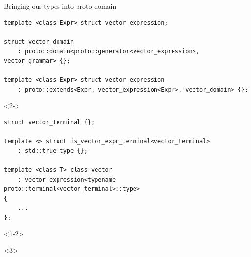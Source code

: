 \documentclass[@BEAMER_OPTIONS@]{beamer}
\begin{document}
\begin{frame}[fragile]{Bringing our types into proto domain}
    \begin{exampleblock}{}
        \begin{lstlisting}
template <class Expr> struct vector_expression;

struct vector_domain
    : proto::domain<proto::generator<vector_expression>, vector_grammar> {};

template <class Expr> struct vector_expression
    : proto::extends<Expr, vector_expression<Expr>, vector_domain> {};
        \end{lstlisting}
    \end{exampleblock}
    \begin{exampleblock}<2->{}
        \begin{lstlisting}
struct vector_terminal {};

template <> struct is_vector_expr_terminal<vector_terminal>
    : std::true_type {};

template <class T> class vector
    : vector_expression<typename proto::terminal<vector_terminal>::type>
{
    ...
};
        \end{lstlisting}
    \end{exampleblock}
    \begin{onlyenv}<1-2>
    \end{onlyenv}
    \begin{onlyenv}<3>
    \end{onlyenv}
\end{frame}
\end{document}

